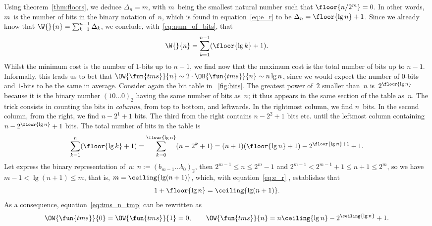 Using theorem~\vref{thm:floors}, we deduce \(\Delta_n = m\), with
\(m\)~being the smallest natural number such that \(\floor{n/2^m} =
0\). In other words, \(m\)~is the number of bits in the binary
notation of~\(n\), which is found in equation~\eqref{eq:e_r} to be
\(\Delta_n = \floor{\lg n} + 1\). Since we already know that \(\W{}{n}
= \sum_{k=1}^{n-1}\Delta_k\), we conclude,
with~\eqref{eq:num_of_bits}, that
\begin{equation}
\W{}{n} = \sum_{k=1}^{n-1}(\floor{\lg k}+1).
\label{eq:tms_n_tmp}
\end{equation}
Whilst the minimum cost is the number of \(1\)-bits up to \(n-1\), we
find now that the maximum cost is the total number of bits up to
\(n-1\). Informally, this leads us to bet that \(\OW{\fun{tms}}{n}
\sim 2 \cdot \OB{\fun{tms}}{n} \sim n\lg n\), since we would expect
the number of \(0\)-bits and \(1\)-bits to be the same in
average. Consider again the bit table in \fig~\vref{fig:bits}. The
greatest power of~\(2\) smaller than~\(n\) is~\(2^{\floor{\lg n}}\)
because it is the binary number \((10\dots0)_2\) having the same
number of bits as~\(n\); it thus appears in the same section of the
table as~\(n\). The trick consists in counting the bits in
\emph{columns}, from top to bottom, and leftwards. In the rightmost
column, we find \(n\)~bits. In the second column, from the right, we
find \(n-2^1+1\) bits. The third from the right contains \(n-2^2+1\)
bits etc. until the leftmost column containing \(n-2^{\floor{\lg
    n}}+1\) bits. The total number of bits in the table is
\begin{equation*}
\sum_{k=1}^{n}{\!(\floor{\lg k}+1)}
   = \sum_{k=0}^{\floor{\lg n}}{\!(n-2^k+1)}
   = (n + 1)(\floor{\lg n} + 1) - 2^{\floor{\lg n}+1} + 1.
\end{equation*}
Let express the binary representation of~\(n\): \(n := (b_{m-1}\dots
b_0)_2\), then \(2^{m-1} \leqslant n \leqslant 2^m - 1\) and \(2^{m-1}
< 2^{m-1} + 1 \leqslant n + 1 \leqslant 2^m\), so we have \(m-1 <
\lg(n+1) \leqslant m\), that is, \(m = \ceiling{\lg(n+1)}\), which,
with equation~\eqref{eq:e_r} , establishes that
\begin{equation*}
  1 + \floor{\lg n} = \ceiling{\lg(n+1)}.
\end{equation*}
As a consequence, equation~\eqref{eq:tms_n_tmp} can be rewritten as
\begin{equation}
\OW{\fun{tms}}{0} = \OW{\fun{tms}}{1} = 0,
\qquad
\OW{\fun{tms}}{n} = n\ceiling{\lg n} - 2^{\ceiling{\lg n}} + 1.
\label{eq:top}
\end{equation}
